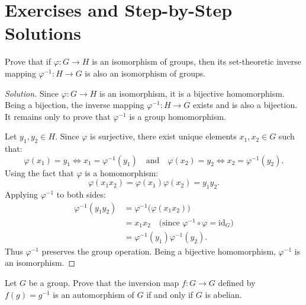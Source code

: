 \section{Exercises and Step-by-Step Solutions}
\label{sec:unit1_exercises}

\begin{problem}
Prove that if $\varphi: G \to H$ is an isomorphism of groups, then its set-theoretic inverse mapping $\varphi^{-1}: H \to G$ is also an isomorphism of groups.
\end{problem}

\begin{proof}[Solution]
Since $\varphi: G \to H$ is an isomorphism, it is a bijective homomorphism.
Being a bijection, the inverse mapping $\varphi^{-1}: H \to G$ exists and is also a bijection.
It remains only to prove that $\varphi^{-1}$ is a group homomorphism.

Let $y_1, y_2 \in H$.
Since $\varphi$ is surjective, there exist unique elements $x_1, x_2 \in G$ such that:
\begin{equation*}
\varphi(x_1) = y_1 \iff x_1 = \varphi^{-1}(y_1) \quad \text{and} \quad \varphi(x_2) = y_2 \iff x_2 = \varphi^{-1}(y_2).
\end{equation*}
Using the fact that $\varphi$ is a homomorphism:
\begin{equation*}
\varphi(x_1 x_2) = \varphi(x_1)\varphi(x_2) = y_1 y_2.
\end{equation*}
Applying $\varphi^{-1}$ to both sides:
\begin{align*}
\varphi^{-1}(y_1 y_2) &= \varphi^{-1}\bigl(\varphi(x_1 x_2)\bigr) \\
&= x_1 x_2 \quad \text{(since $\varphi^{-1} \circ \varphi = \text{id}_G$)} \\
&= \varphi^{-1}(y_1)\varphi^{-1}(y_2).
\end{align*}
Thus $\varphi^{-1}$ preserves the group operation. Being a bijective homomorphism, $\varphi^{-1}$ is an isomorphism.
\end{proof}

\begin{problem}
Let $G$ be a group. Prove that the inversion map $f: G \to G$ defined by $f(g) = g^{-1}$ is an automorphism of $G$ if and only if $G$ is abelian.
\end{problem}

